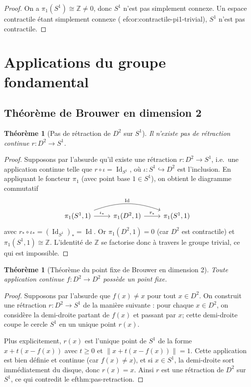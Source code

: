 \documentclass[12pt,a4paper,openany]{book}
\theoremstyle{definition}
\theoremstyle{plain}
\newtheorem{theoreme}[definition]{Théorème}
\theoremstyle{remark}
\newcommand{\Z}{\mathbb{Z}}
\DeclareMathOperator{\Id}{Id}
\begin{document}
\begin{proof}
On a $\pi_1(S^1) \cong \Z \neq 0$, donc $S^1$ n'est pas simplement connexe.
Un espace contractile étant simplement connexe (
ef{cor:contractile-pi1-trivial}),
$S^1$ n'est pas contractile.
\end{proof}

\section{Applications du groupe fondamental}\label{sec:applications-pi1}

\subsection{Théorème de Brouwer en dimension 2}\label{subsec:brouwer}

\begin{theoreme}[Pas de rétraction de $D^2$ sur $S^1$]\label{thm:pas-retraction}
Il n'existe pas de rétraction continue $r : D^2 \to S^1$.
\end{theoreme}

\begin{proof}
Supposons par l'absurde qu'il existe une rétraction $r : D^2 \to S^1$, i.e.\ une
application continue telle que $r \circ \iota = \Id_{S^1}$, où
$\iota : S^1 \hookrightarrow D^2$ est l'inclusion. En appliquant le foncteur
$\pi_1$ (avec point base $1 \in S^1$), on obtient le diagramme commutatif
\[
\begin{tikzcd}
\pi_1(S^1, 1) \arrow[r, "\iota_*"] \arrow[rr, bend left=20, "\Id"] & \pi_1(D^2, 1) \arrow[r, "r_*"] & \pi_1(S^1, 1)
\end{tikzcd}
\]
avec $r_* \circ \iota_* = (\Id_{S^1})_* = \Id$. Or $\pi_1(D^2, 1) = 0$ (car
$D^2$ est contractile) et $\pi_1(S^1, 1) \cong \Z$. L'identité de $\Z$ se
factorise donc à travers le groupe trivial, ce qui est impossible.
\end{proof}

\begin{theoreme}[Théorème du point fixe de Brouwer en dimension 2]\label{thm:brouwer-dim2}
Toute application continue $f : D^2 \to D^2$ possède un point fixe.
\end{theoreme}

\begin{proof}
Supposons par l'absurde que $f(x) \neq x$ pour tout $x \in D^2$. On construit
une rétraction $r : D^2 \to S^1$ de la manière suivante : pour chaque
$x \in D^2$, on considère la demi-droite partant de $f(x)$ et passant par $x$;
cette demi-droite coupe le cercle $S^1$ en un unique point $r(x)$.

Plus explicitement, $r(x)$ est l'unique point de $S^1$ de la forme
$x + t(x - f(x))$ avec $t \geqslant 0$ et $\|x + t(x - f(x))\| = 1$. Cette
application est bien définie et continue (car $f(x) \neq x$), et si $x \in S^1$,
la demi-droite sort immédiatement du disque, donc $r(x) = x$. Ainsi $r$ est une
rétraction de $D^2$ sur $S^1$, ce qui contredit le 
ef{thm:pas-retraction}.
\end{proof}
\end{document}
